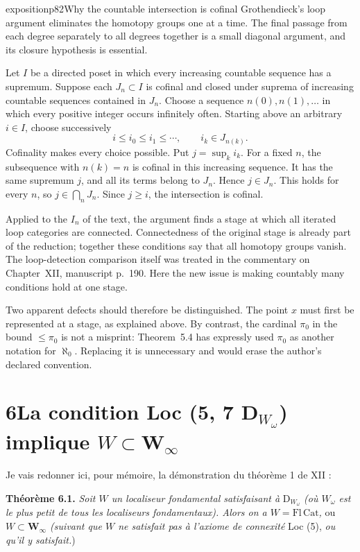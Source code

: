 \begin{dcomment}{exposition}{p82}{Why the countable intersection is cofinal}
Grothendieck's loop argument eliminates the homotopy groups one at a time. The final passage from each degree separately to all degrees together is a small diagonal argument, and its closure hypothesis is essential.

Let $I$ be a directed poset in which every increasing countable sequence has a supremum. Suppose each $J_n\subset I$ is cofinal and closed under suprema of increasing countable sequences contained in $J_n$. Choose a sequence $n(0),n(1),\ldots$ in which every positive integer occurs infinitely often. Starting above an arbitrary $i\in I$, choose successively
\[
 i\leq i_0\leq i_1\leq\cdots,
 \qquad i_k\in J_{n(k)}.
\]
Cofinality makes every choice possible. Put $j=\sup_k i_k$. For a fixed $n$, the subsequence with $n(k)=n$ is cofinal in this increasing sequence. It has the same supremum $j$, and all its terms belong to $J_n$. Hence $j\in J_n$. This holds for every $n$, so $j\in\bigcap_nJ_n$. Since $j\geq i$, the intersection is cofinal.

Applied to the $I_n$ of the text, the argument finds a stage at which all iterated loop categories are connected. Connectedness of the original stage is already part of the reduction; together these conditions say that all homotopy groups vanish. The loop-detection comparison itself was treated in the commentary on Chapter~XII, manuscript p.~190. Here the new issue is making countably many conditions hold at one stage.

Two apparent defects should therefore be distinguished. The point $x$ must first be represented at a stage, as explained above. By contrast, the cardinal $\pi_0$ in the bound $\leq\pi_0$ is not a misprint: Theorem~5.4 has expressly used $\pi_0$ as another notation for $\aleph_0$. Replacing it is unnecessary and would erase the author's declared convention.
\end{dcomment}


\section*{6\quad La condition Loc (5, 7 D$_{W_\omega}$) implique $W \subset \mathbf{W}_\infty$}

Je vais redonner ici, pour mémoire, la démonstration du théorème 1 de XII :

\textbf{Théorème 6.1.} \textit{Soit $W$ un localiseur fondamental satisfaisant à} D$_{W_\omega}$ \textit{(où $W_\omega$ est le plus petit de tous les localiseurs fondamentaux). Alors on a $W = \mathrm{Fl}\,\mathrm{Cat}$,} ou \textit{$W \subset \mathbf{W}_\infty$ (suivant que $W$ ne satisfait pas à l'axiome de connexité} Loc (5), \textit{ou qu'il y satisfait.})

